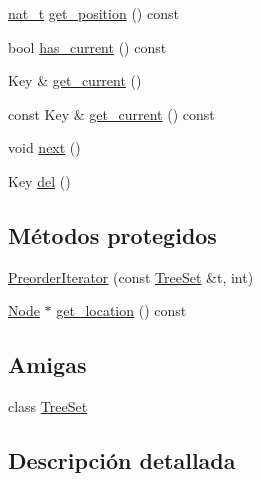 \begin{DoxyCompactItemize}
\item 
\hyperlink{namespace_designar_aa72662848b9f4815e7bf31a7cf3e33d1}{nat\+\_\+t} \hyperlink{class_designar_1_1_tree_set_1_1_preorder_iterator_a76a9499f0414651a4399f57f7568b168}{get\+\_\+position} () const
\item 
bool \hyperlink{class_designar_1_1_tree_set_1_1_preorder_iterator_a24d3c99c070468afe487e41fb17fec2d}{has\+\_\+current} () const
\item 
Key \& \hyperlink{class_designar_1_1_tree_set_1_1_preorder_iterator_a46bb02ac787f59ccd00eb1dc9ec360d1}{get\+\_\+current} ()
\item 
const Key \& \hyperlink{class_designar_1_1_tree_set_1_1_preorder_iterator_a1361ceae79bd57279177e2a1a76ee200}{get\+\_\+current} () const
\item 
void \hyperlink{class_designar_1_1_tree_set_1_1_preorder_iterator_a8d9d382d80687846dc21f9b5445d59c7}{next} ()
\item 
Key \hyperlink{class_designar_1_1_tree_set_1_1_preorder_iterator_aafc85391980a0a0d29b1f86827c47018}{del} ()
\end{DoxyCompactItemize}
\subsection*{Métodos protegidos}
\begin{DoxyCompactItemize}
\item 
\hyperlink{class_designar_1_1_tree_set_1_1_preorder_iterator_af0ff9e1f0ab3f2d488565b0337cd5205}{Preorder\+Iterator} (const \hyperlink{class_designar_1_1_tree_set}{Tree\+Set} \&t, int)
\item 
\hyperlink{class_designar_1_1_tree_set_a7409a9c1545c0e9e2fd6b84120713c99}{Node} $\ast$ \hyperlink{class_designar_1_1_tree_set_1_1_preorder_iterator_a869f68f8626743605781bb18cfd13bbb}{get\+\_\+location} () const
\end{DoxyCompactItemize}
\subsection*{Amigas}
\begin{DoxyCompactItemize}
\item 
class \hyperlink{class_designar_1_1_tree_set_1_1_preorder_iterator_a7caa42294700d2a60905ec3458a7cd8a}{Tree\+Set}
\end{DoxyCompactItemize}


\subsection{Descripción detallada}
